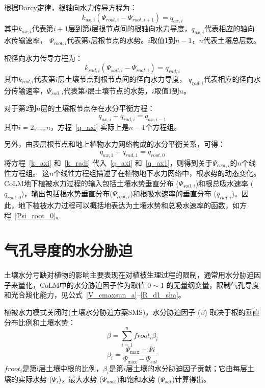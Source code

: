 根据Darcy定律，根轴向水力传导方程为：
\begin{equation}\label{k_axi}
k_{ax,i}\left(\Psi_{root,i}-\Psi_{root,i+1}\right)=q_{ax,i}
\end{equation}
其中$k_{ax,i}$代表第$i+1$层到第i层根节点间的根轴向水力导度，$q_{ax,i}$代表相应的轴向水传输速率，
$\Psi_{root,i}$代表第$i$层根节点的水势。$i$取值1到$n-1$，$n$代表土壤总层数。

根径向水力传导方程为：
\begin{equation}\label{k_radi}
k_{rad,i}\left(\Psi_{soil,i}-\Psi_{root,i}\right)=q_{rad,i}
\end{equation}
其中$k_{rad,i}$代表第$i$层土壤节点到根节点间的径向水力导度，
$q_{rad,i}$代表相应的径向水分传输速率，$\Psi_{soil,i}$代表第$i$层土壤节点的水势，$i$取值1到$n$。



对于第2到$n$层的土壤根节点存在水分平衡方程：
\begin{equation}\label{q_axi}
q_{a x, i}+q_{r a d, i}=q_{a x, i-1}
\end{equation}
其中$i=2, \ldots, n$，方程~\eqref{q_axi} 实际上是$n-1$个方程组。


另外，由表层根节点和地上植物水力网络构成的水分平衡关系，可得：
\begin{equation}\label{q_ax1}
q_{ax,1}+q_{rad, 1}=q_{root,0}
\end{equation}
将方程~\eqref{k_axi} 和~\eqref{k_radi} 代入~\eqref{q_axi} 和~\eqref{q_ax1}，则得到关于$ \Psi_{root,i}$的$n$个线性方程组。
这$n$个线性方程组描述了在植物地下水力网络中，根水势的动态变化。CoLM地下植被水力过程的输入包括土壤水势垂直分布 ($\Psi_{soil,i}$)和根总吸水速率 ($q_{root,0}$)，输出包括根水势垂直分布($\Psi_{root,i}$)和根吸水速率的垂直分布 ($q_{rad,i}$)。因此，地下植被水力过程可以概括地表达为土壤水势和总吸水速率的函数，如方程~\eqref{Psi_root_0}。


\section{气孔导度的水分胁迫}\label{气孔导度的水分胁迫}
土壤水分亏缺对植物的影响主要表现在对植被生理过程的限制，通常用水分胁迫因子来量化，CoLM中的水分胁迫因子作为取值 $0\sim 1$ 的无量纲变量，限制气孔导度和光合羧化能力，见公式~\eqref{V_cmaxsun_a}--\eqref{R_d1_sha}。

植被水力模式关闭时(土壤水分胁迫方案SMS)，水分胁迫因子 ($\beta$) 取决于根的垂直分布比例和土壤水势：
\begin{equation}\label{beta_0}
\beta=\sum_{i=1}^{n} froot_i \beta_{i}
\end{equation}
%
\begin{equation}\label{beta_i}
\beta_{i}=\frac{\Psi_{\max }-\Psi i}{\Psi_{\max }-\Psi_{s a t}}
\end{equation}
$froot_i$是第i层土壤中根的比例，$\beta_i$是第$i$层土壤的水分胁迫因子贡献；它由每层土壤的实际水势 (${\Psi}_i$)，最大水势 (${\Psi}_{max}$)和饱和水势 (${\Psi}_{sat}$)计算得出。

